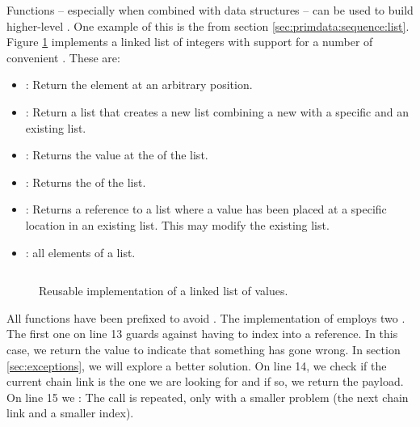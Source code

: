 Functions -- especially when combined with data structures -- can be used to build higher-level . One example of this is the  from section \ref{sec:primdata:sequence:list}. Figure \ref{fig:fun:case:list} implements a linked list of integers with support for a number of convenient . These are:

\begin{itemize}
  \item {}: Return the element at an arbitrary position.
  \item {}: Return a list that creates a new list combining a new  with a specific  and an existing list.
  \item {}: Returns the value at the  of the list.
  \item {}: Returns the  of the list.
  \item {}: Returns a reference to a list where a value has been placed at a specific location in an existing list. This may modify the existing list.
  \item {}:  all elements of a list.
\end{itemize}

\begin{figure}[tbp]
  \inputminted[linenos,firstline=12]{csharp}{../src/csharp/functions/list/Program.cs}
  \caption{Reusable implementation of a linked list of  values.}
  \label{fig:fun:case:list}
\end{figure}

All functions have been prefixed  to avoid . The implementation of  employs two . The first one on line 13 guards against having to index into a  reference. In this case, we return the value  to indicate that something has gone wrong. In section \ref{sec:exceptions}, we will explore a better solution. On line 14, we check if the current chain link is the one we are looking for and if so, we return the payload. On line 15 we : The call is repeated, only with a smaller problem (the next chain link and a smaller index).

